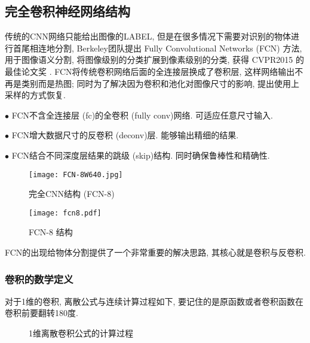 \subsection{完全卷积神经网络结构}
传统的CNN网络只能给出图像的LABEL, 但是在很多情况下需要对识别的物体进行首尾相连地分割,
Berkeley团队提出 Fully Convolutional Networks (FCN) 方法, 用于图像语义分割,
将图像级别的分类扩展到像素级别的分类, 获得 CVPR2015 的 最佳论文奖 \cite{Long2015-9593}.
FCN将传统卷积网络后面的全连接层换成了卷积层, 这样网络输出不再是类别而是热图;
同时为了解决因为卷积和池化对图像尺寸的影响, 提出使用上采样的方式恢复.

$\bullet$ FCN不含全连接层 (fc)的全卷积 (fully conv)网络. 可适应任意尺寸输入.

$\bullet$ FCN增大数据尺寸的反卷积 (deconv)层. 能够输出精细的结果.

$\bullet$ FCN结合不同深度层结果的跳级 (skip)结构. 同时确保鲁棒性和精确性.
\begin{figure}[H]
    \centering
    \texttt{[image: FCN-8W640.jpg]}
    \caption{完全CNN结构 (FCN-8) \cite{PiramanayagamSaber2018-9591}}
    \label{FCN-8W640}
    \vspace{-0.4cm}
\end{figure}
\begin{figure}[H]
    \centering
    \texttt{[image: fcn8.pdf]}
    \caption{FCN-8 结构 \cite{PiramanayagamSaber2018-9591}}
    \label{CNNfcn80203}
    \vspace{-0.4cm}
\end{figure}

FCN的出现给物体分割提供了一个非常重要的解决思路, 其核心就是卷积与反卷积.
\subsubsection{卷积的数学定义}
对于1维的卷积, 离散公式与连续计算过程如下, 要记住的是原函数或者卷积函数在卷积前要翻转180度.
\begin{figure}[H]
\centering
{}
\caption{1维离散卷积公式的计算过程}
\label{ConvolutionOP0203}
\end{figure}

